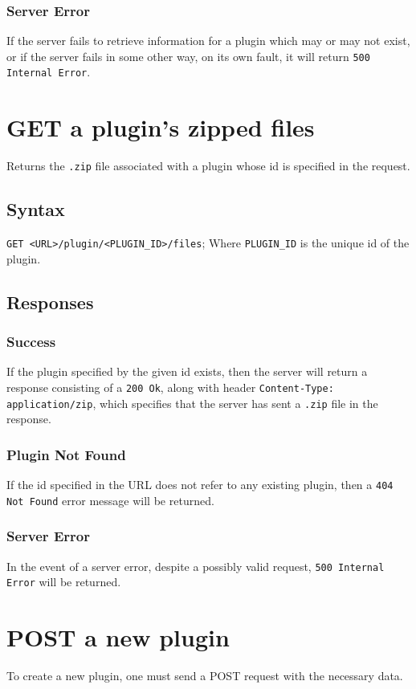 \documentclass[a4paper, 12pt]{article}
\begin{document}
			\subsubsection{Server Error}
				If the server fails to retrieve information for a plugin which may or may not exist, or if the server fails in some other way, on its own fault, it will return \verb|500 Internal Error|.

	\section{GET a plugin's zipped files}
		Returns the \verb|.zip| file associated with a plugin whose id is specified in the request.

		\subsection{Syntax}
			\verb|GET <URL>/plugin/<PLUGIN_ID>/files|; \footnotesize{Where \verb|PLUGIN_ID| is the unique id of the plugin.}

		\subsection{Responses}
			\subsubsection{Success}
				If the plugin specified by the given id exists, then the server will return a response consisting of a \verb|200 Ok|, along with header \verb|Content-Type: application/zip|, which specifies that the server has sent a \verb|.zip| file in the response.

			\subsubsection{Plugin Not Found}
				If the id specified in the URL does not refer to any existing plugin, then a \verb|404 Not Found| error message will be returned.

			\subsubsection{Server Error}
				In the event of a server error, despite a possibly valid request, \verb|500 Internal Error| will be returned.

	\section{POST a new plugin}
		To create a new plugin, one must send a POST request with the necessary data.
\end{document}
